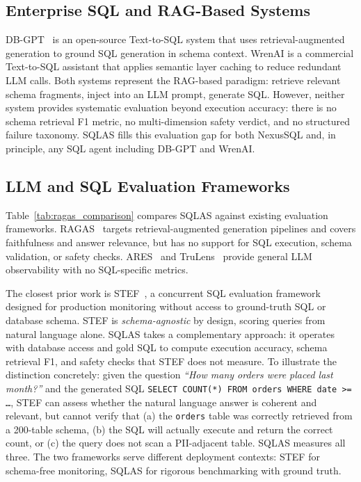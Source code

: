 \documentclass[conference]{IEEEtran}
\begin{document}
\subsection{Enterprise SQL and RAG-Based Systems}

DB-GPT~\cite{dbgpt} is an open-source Text-to-SQL system that uses
retrieval-augmented generation to ground SQL generation in schema
context. WrenAI is a commercial Text-to-SQL assistant that applies
semantic layer caching to reduce redundant LLM calls. Both systems
represent the RAG-based paradigm: retrieve relevant schema fragments,
inject into an LLM prompt, generate SQL. However, neither system
provides systematic evaluation beyond execution accuracy: there is no
schema retrieval F1 metric, no multi-dimension safety verdict, and no
structured failure taxonomy. SQLAS fills this evaluation gap for both
NexusSQL and, in principle, any SQL agent including DB-GPT and WrenAI.

\subsection{LLM and SQL Evaluation Frameworks}

Table~\ref{tab:ragas_comparison} compares SQLAS against existing evaluation
frameworks. RAGAS~\cite{ragas} targets retrieval-augmented generation pipelines
and covers faithfulness and answer relevance, but has no support for SQL
execution, schema validation, or safety checks. ARES~\cite{ares} and
TruLens~\cite{trulens} provide general LLM observability with no
SQL-specific metrics.

The closest prior work is STEF~\cite{stef}, a concurrent SQL evaluation
framework designed for production monitoring without access to ground-truth
SQL or database schema. STEF is \emph{schema-agnostic} by design, scoring
queries from natural language alone. SQLAS takes a complementary approach:
it operates with database access and gold SQL to compute execution accuracy,
schema retrieval F1, and safety checks that STEF does not measure.
To illustrate the distinction concretely: given the question
\emph{``How many orders were placed last month?''} and the generated SQL
\texttt{SELECT COUNT(*) FROM orders WHERE date >= \ldots},
STEF can assess whether the natural language answer is coherent and
relevant, but cannot verify that (a) the \texttt{orders} table was
correctly retrieved from a 200-table schema, (b) the SQL will actually
execute and return the correct count, or (c) the query does not scan a
PII-adjacent table. SQLAS measures all three.
The two frameworks serve different deployment contexts: STEF for
schema-free monitoring, SQLAS for rigorous benchmarking with ground truth.
\end{document}
